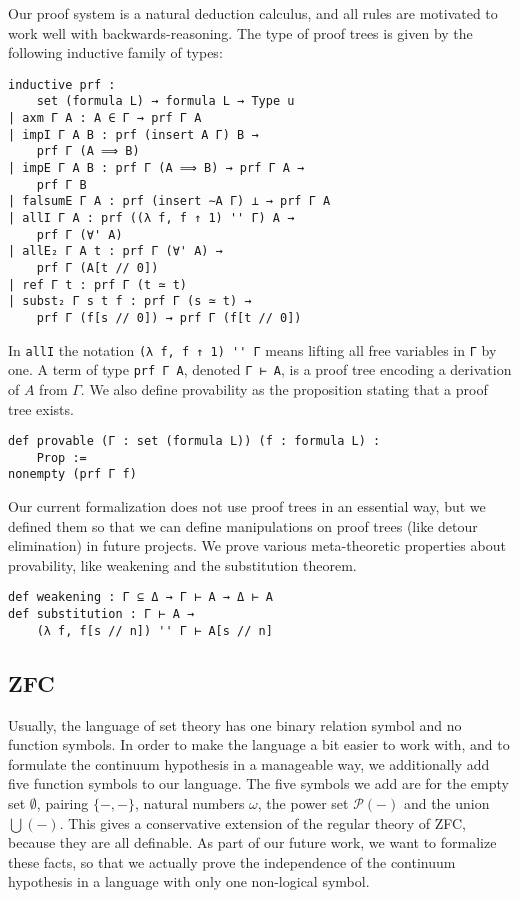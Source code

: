 \documentclass[sigplan,10pt,review, anonymous]{acmart}
\newcommand{\lil}{\lstinline}
\theoremstyle{definition}
\begin{document}
Our proof system is a natural deduction calculus, and all rules are motivated to work well with backwards-reasoning. The type of proof trees is given by the following inductive family of types:
\begin{lstlisting}
inductive prf :
    set (formula L) → formula L → Type u
| axm Γ A : A ∈ Γ → prf Γ A
| impI Γ A B : prf (insert A Γ) B →
    prf Γ (A ⟹ B)
| impE Γ A B : prf Γ (A ⟹ B) → prf Γ A →
    prf Γ B
| falsumE Γ A : prf (insert ∼A Γ) ⊥ → prf Γ A
| allI Γ A : prf ((λ f, f ↑ 1) '' Γ) A →
    prf Γ (∀' A)
| allE₂ Γ A t : prf Γ (∀' A) →
    prf Γ (A[t // 0])
| ref Γ t : prf Γ (t ≃ t)
| subst₂ Γ s t f : prf Γ (s ≃ t) →
    prf Γ (f[s // 0]) → prf Γ (f[t // 0])
\end{lstlisting}
In \lil{allI} the notation \lil{(λ f, f ↑ 1) '' Γ} means lifting all free variables in \lil{Γ} by one.
A term of type \lil{prf Γ A}, denoted \lil{Γ ⊢ A}, is a proof tree encoding a derivation of $A$ from $\Gamma$.
We also define provability as the proposition stating that a proof tree exists.
\begin{lstlisting}
def provable (Γ : set (formula L)) (f : formula L) :
    Prop :=
nonempty (prf Γ f)
\end{lstlisting}
Our current formalization does not use proof trees in an essential way, but we defined them so that we can define manipulations on proof trees (like detour elimination) in future projects.
We prove various meta-theoretic properties about provability, like weakening and the substitution theorem.
\begin{lstlisting}
def weakening : Γ ⊆ Δ → Γ ⊢ A → Δ ⊢ A
def substitution : Γ ⊢ A →
    (λ f, f[s // n]) '' Γ ⊢ A[s // n]
\end{lstlisting}
\subsection{ZFC}
\label{subsection:fol:zfc}

Usually, the language of set theory has one binary relation symbol and no function symbols.
In order to make the language a bit easier to work with, and to formulate the continuum hypothesis in a manageable way, we additionally add five function symbols to our language.
The five symbols we add are for the empty set \(\emptyset\), pairing \(\{{-},{-}\}\), natural numbers \(\omega\), the power set \(\mathcal{P}({-})\) and the union \(\bigcup({-})\).
This gives a conservative extension of the regular theory of ZFC, because they are all definable.
As part of our future work, we want to formalize these facts, so that we actually prove the independence of the continuum hypothesis in a language with only one non-logical symbol.
\end{document}
